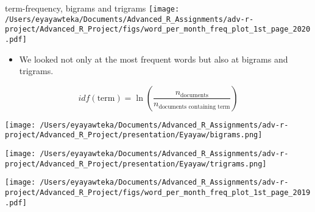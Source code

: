 \documentclass[
  10pt,
  ignorenonframetext,
]{beamer}
\newif\ifbibliography
\providecommand{\tightlist}{%
  \setlength{\itemsep}{0pt}\setlength{\parskip}{0pt}}
\begin{document}
\begin{frame}{term-frequency, bigrams and trigrams}
\protect\hypertarget{term-frequency-bigrams-and-trigrams}{}
\texttt{[image: /Users/eyayawteka/Documents/Advanced\_R\_Assignments/adv-r-project/Advanced\_R\_Project/figs/word\_per\_month\_freq\_plot\_1st\_page\_2020.pdf]}
\end{frame}

\begin{frame}
\begin{itemize}
\tightlist
\item
  We looked not only at the most frequent words but also at bigrams and
  trigrams.
\end{itemize}

\[
idf(\text{term}) = \ln{\left(\frac{n_{\text{documents}}}{n_{\text{documents containing term}}}\right)}
\]

\texttt{[image: /Users/eyayawteka/Documents/Advanced\_R\_Assignments/adv-r-project/Advanced\_R\_Project/presentation/Eyayaw/bigrams.png]}
\end{frame}

\begin{frame}
\texttt{[image: /Users/eyayawteka/Documents/Advanced\_R\_Assignments/adv-r-project/Advanced\_R\_Project/presentation/Eyayaw/trigrams.png]}
\end{frame}

\begin{frame}
\texttt{[image: /Users/eyayawteka/Documents/Advanced\_R\_Assignments/adv-r-project/Advanced\_R\_Project/figs/word\_per\_month\_freq\_plot\_1st\_page\_2019.pdf]}

\nocite{R-kableExtra} \nocite{R-tidyverse} \nocite{R-lubridate}
\end{frame}

\begin{frame}[allowframebreaks]{}
  \bibliographytrue
  
\end{frame}
\end{document}
